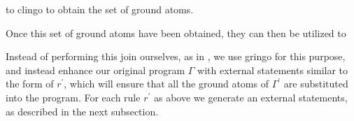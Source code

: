 to clingo to obtain the set of ground atoms.

Once this set of ground atoms have been obtained, they can then be utilized to

Instead of performing this join ourselves, as in \cite{agcapevidi17a},
we use gringo for this purpose, and instead enhance our original
program $\Gamma$ with external statements similar to the form of
$r^{\prime}$, which will ensure that all the ground atoms of
$\Gamma^{\prime}$ are substituted into the program. For each rule
$r^{\prime}$ as above we generate an external statements, as described
in the next subsection.
